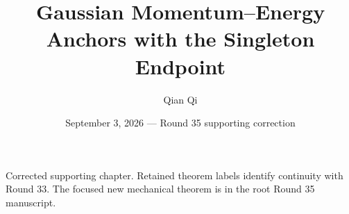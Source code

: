 \documentclass[10pt,reqno]{amsart}
\title{Gaussian Momentum--Energy Anchors with the Singleton Endpoint}
\author{Qian Qi}
\date{September 3, 2026 --- Round 35 supporting correction}
\begin{document}
\maketitle
\noindent Corrected supporting chapter. Retained theorem labels identify continuity with Round 33. The focused new mechanical theorem is in the root Round 35 manuscript.

\end{document}
